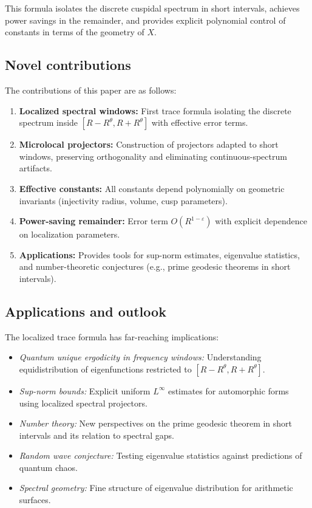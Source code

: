 This formula isolates the discrete cuspidal spectrum in short intervals, 
achieves power savings in the remainder, 
and provides explicit polynomial control of constants in terms of the geometry of $X$. 

\subsection{Novel contributions}\label{subsec:novelty}

The contributions of this paper are as follows:
\begin{enumerate}
  \item \textbf{Localized spectral windows:} First trace formula isolating the discrete spectrum 
  inside $[R-R^\theta,R+R^\theta]$ with effective error terms.
  \item \textbf{Microlocal projectors:} Construction of projectors adapted to short windows, 
  preserving orthogonality and eliminating continuous-spectrum artifacts.
  \item \textbf{Effective constants:} All constants depend polynomially on geometric invariants 
  (injectivity radius, volume, cusp parameters).
  \item \textbf{Power-saving remainder:} Error term $O(R^{1-\varepsilon})$ 
  with explicit dependence on localization parameters.
  \item \textbf{Applications:} Provides tools for sup-norm estimates, eigenvalue statistics, 
  and number-theoretic conjectures (e.g., prime geodesic theorems in short intervals).
\end{enumerate}

\subsection{Applications and outlook}\label{subsec:applications}

The localized trace formula has far-reaching implications:
\begin{itemize}
  \item \emph{Quantum unique ergodicity in frequency windows:} 
  Understanding equidistribution of eigenfunctions restricted to $[R-R^\theta,R+R^\theta]$.
  \item \emph{Sup-norm bounds:} Explicit uniform $L^\infty$ estimates for automorphic forms 
  using localized spectral projectors.
  \item \emph{Number theory:} New perspectives on the prime geodesic theorem in short intervals 
  and its relation to spectral gaps.
  \item \emph{Random wave conjecture:} Testing eigenvalue statistics against predictions of quantum chaos.
  \item \emph{Spectral geometry:} Fine structure of eigenvalue distribution for arithmetic surfaces.
\end{itemize}

